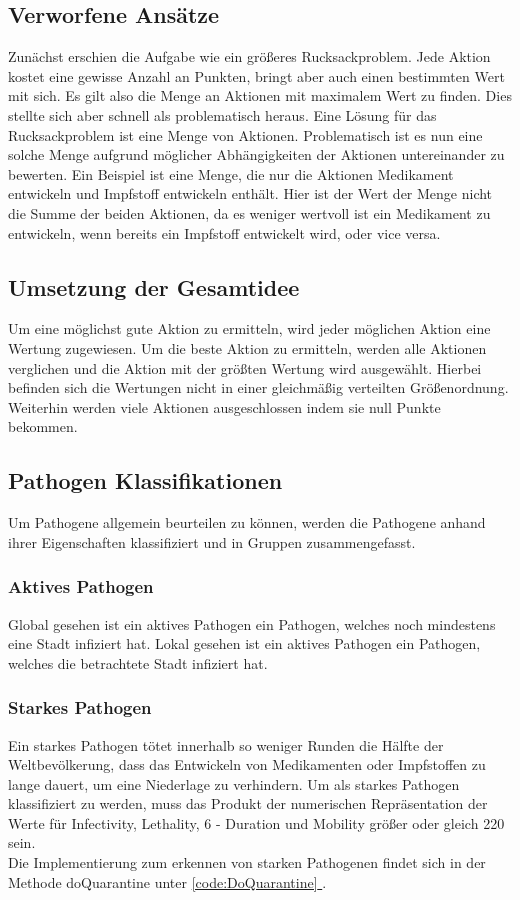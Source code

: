 \documentclass{article}
\newcommand{\fullref}[1]{\hyperref[{#1}]{\ref{#1} \nameref{#1}}} %
\newcommand{\gquote}[1]{\glqq #1\grqq} %
\begin{document}
\subsection{Verworfene Ansätze}
Zunächst erschien die Aufgabe wie ein größeres Rucksackproblem. Jede Aktion kostet eine gewisse Anzahl an Punkten, bringt aber auch einen bestimmten Wert mit sich. Es gilt also die Menge an Aktionen mit maximalem Wert zu finden. Dies stellte sich aber schnell als problematisch heraus. Eine Lösung für das Rucksackproblem ist eine Menge von Aktionen. Problematisch ist es nun eine solche Menge aufgrund möglicher Abhängigkeiten der Aktionen untereinander zu bewerten. Ein Beispiel ist eine Menge, die nur die Aktionen \gquote{Medikament entwickeln} und \gquote{Impfstoff entwickeln} enthält. Hier ist der Wert der Menge nicht die Summe der beiden Aktionen, da es weniger wertvoll ist ein Medikament zu entwickeln, wenn bereits ein Impfstoff entwickelt wird, oder vice versa.
\label{sec:Ansaetze}
\subsection{Umsetzung der Gesamtidee}
Um eine möglichst gute Aktion zu ermitteln, wird jeder möglichen Aktion eine Wertung zugewiesen. Um die beste Aktion zu ermitteln, werden alle Aktionen verglichen und die Aktion mit der größten Wertung wird ausgewählt. Hierbei befinden sich die Wertungen nicht in einer gleichmäßig verteilten Größenordnung. Weiterhin werden viele Aktionen ausgeschlossen indem sie null Punkte bekommen.
\subsection{Pathogen Klassifikationen}
Um Pathogene allgemein beurteilen zu können, werden die Pathogene anhand ihrer Eigenschaften klassifiziert und in Gruppen zusammengefasst.
\subsubsection{Aktives Pathogen}
\label{sec:AktivesPathogen}
Global gesehen ist ein aktives Pathogen ein Pathogen, welches noch mindestens eine Stadt infiziert hat. Lokal gesehen ist ein aktives Pathogen ein Pathogen, welches die betrachtete Stadt infiziert hat.
\subsubsection{Starkes Pathogen}
\label{sec:StarkesPathogen}
Ein starkes Pathogen tötet innerhalb so weniger Runden die Hälfte der Weltbevölkerung, dass das Entwickeln von Medikamenten oder Impfstoffen zu lange dauert, um eine Niederlage zu verhindern. Um als starkes Pathogen klassifiziert zu werden, muss das Produkt der numerischen Repräsentation der Werte für \gquote{Infectivity}, \gquote{Lethality}, 6 - \gquote{Duration} und \gquote{Mobility} größer oder gleich 220 sein. \\
Die Implementierung zum erkennen von starken Pathogenen findet sich in der Methode \gquote{doQuarantine} unter \fullref{code:DoQuarantine}.
\end{document}
